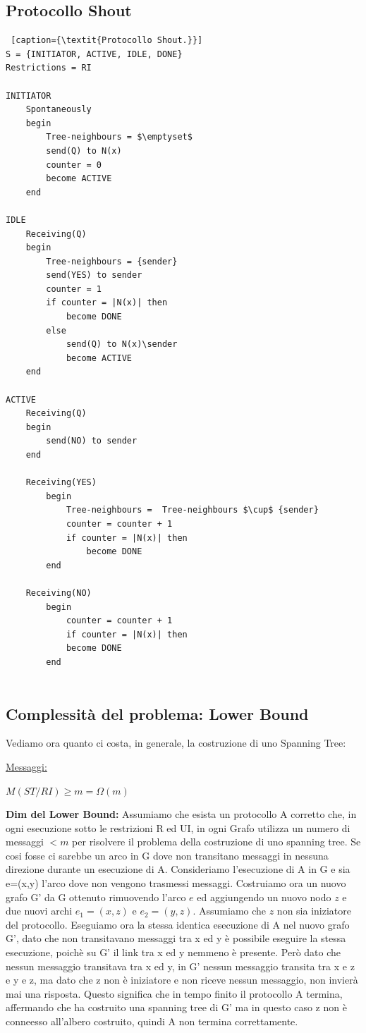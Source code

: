 \subsection{Protocollo Shout}
\begin{lstlisting} [caption={\textit{Protocollo Shout.}}]
S = {INITIATOR, ACTIVE, IDLE, DONE}
Restrictions = RI

INITIATOR 
    Spontaneously
    begin
        Tree-neighbours = $\emptyset$
        send(Q) to N(x)
        counter = 0
        become ACTIVE
    end

IDLE
    Receiving(Q)
    begin
        Tree-neighbours = {sender}
        send(YES) to sender
        counter = 1
        if counter = |N(x)| then
            become DONE
        else
            send(Q) to N(x)\sender
            become ACTIVE
    end

ACTIVE
    Receiving(Q)
    begin
        send(NO) to sender
    end
    
    Receiving(YES)
        begin
            Tree-neighbours =  Tree-neighbours $\cup$ {sender}
            counter = counter + 1
            if counter = |N(x)| then 
                become DONE        
        end
    
    Receiving(NO)
        begin
            counter = counter + 1
            if counter = |N(x)| then
            become DONE
        end
    
\end{lstlisting}

\subsection{Complessità del problema: Lower Bound}
Vediamo ora quanto ci costa, in generale, la costruzione di uno Spanning Tree:

\underline{Messaggi:}
\begin{center}
    $M(ST/RI) \geq m = \Omega(m)$
\end{center}
\textbf{Dim del Lower Bound:}
Assumiamo che esista un protocollo A corretto che, in ogni esecuzione sotto le
restrizioni R ed UI, in ogni Grafo utilizza un numero di messaggi $<m$ per
risolvere il problema della costruzione di uno spanning tree. Se cosi fosse ci
sarebbe un arco in G dove non transitano messaggi in nessuna direzione durante
un esecuzione di A. Consideriamo l'esecuzione di A in G e sia e=(x,y) l'arco
dove non vengono trasmessi messaggi. Costruiamo ora un nuovo grafo G' da G
ottenuto rimuovendo l'arco $e$ ed aggiungendo un nuovo nodo $z$ e due nuovi
archi $e_1=(x,z)$ e $e_2=(y,z)$. Assumiamo che $z$ non sia iniziatore del
protocollo. Eseguiamo ora la stessa identica esecuzione di A nel nuovo grafo G',
dato che non transitavano messaggi tra x ed y è possibile eseguire la stessa
esecuzione, poichè su G' il link tra x ed y nemmeno è presente. Però dato che
nessun messaggio transitava tra x ed y, in G' nessun messaggio transita tra x e
z e y e z, ma dato che z non è iniziatore e non riceve nessun messaggio, non
invierà mai una risposta. Questo significa che in tempo finito il protocollo A
termina, affermando che ha costruito una spanning tree di G' ma in questo caso z
non è conneesso all'albero costruito, quindi A non termina correttamente.

